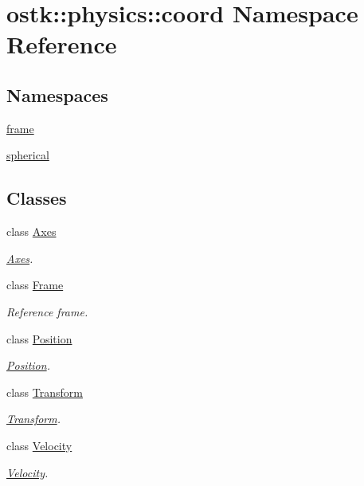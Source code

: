 \hypertarget{namespaceostk_1_1physics_1_1coord}{}\section{ostk\+:\+:physics\+:\+:coord Namespace Reference}
\label{namespaceostk_1_1physics_1_1coord}
\subsection*{Namespaces}
\begin{DoxyCompactItemize}
\item 
 \hyperlink{namespaceostk_1_1physics_1_1coord_1_1frame}{frame}
\item 
 \hyperlink{namespaceostk_1_1physics_1_1coord_1_1spherical}{spherical}
\end{DoxyCompactItemize}
\subsection*{Classes}
\begin{DoxyCompactItemize}
\item 
class \hyperlink{classostk_1_1physics_1_1coord_1_1_axes}{Axes}
\begin{DoxyCompactList}\small\item\em \hyperlink{classostk_1_1physics_1_1coord_1_1_axes}{Axes}. \end{DoxyCompactList}\item 
class \hyperlink{classostk_1_1physics_1_1coord_1_1_frame}{Frame}
\begin{DoxyCompactList}\small\item\em Reference frame. \end{DoxyCompactList}\item 
class \hyperlink{classostk_1_1physics_1_1coord_1_1_position}{Position}
\begin{DoxyCompactList}\small\item\em \hyperlink{classostk_1_1physics_1_1coord_1_1_position}{Position}. \end{DoxyCompactList}\item 
class \hyperlink{classostk_1_1physics_1_1coord_1_1_transform}{Transform}
\begin{DoxyCompactList}\small\item\em \hyperlink{classostk_1_1physics_1_1coord_1_1_transform}{Transform}. \end{DoxyCompactList}\item 
class \hyperlink{classostk_1_1physics_1_1coord_1_1_velocity}{Velocity}
\begin{DoxyCompactList}\small\item\em \hyperlink{classostk_1_1physics_1_1coord_1_1_velocity}{Velocity}. \end{DoxyCompactList}\end{DoxyCompactItemize}
